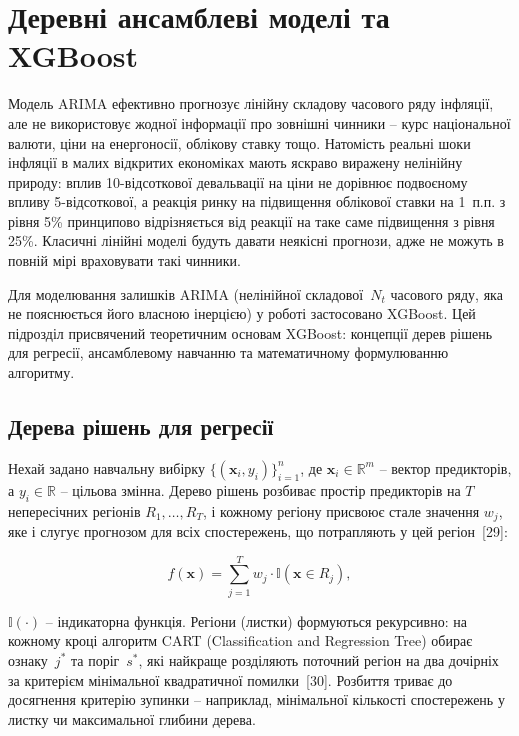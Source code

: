 \documentclass{bachelor_thesis}
\begin{document}
\section{Деревні ансамблеві моделі та XGBoost}

 Модель ARIMA ефективно прогнозує лінійну складову часового ряду інфляції, але не використовує жодної інформації про зовнішні чинники -- курс національної валюти, ціни на енергоносії, облікову ставку тощо. Натомість реальні шоки інфляції в малих відкритих економіках мають яскраво виражену нелінійну природу: вплив 10-відсоткової девальвації на ціни не дорівнює подвоєному впливу 5-відсоткової, а реакція ринку на підвищення облікової ставки на 1~п.п. з рівня 5\% принципово відрізняється від реакції на таке саме підвищення з рівня 25\%. Класичні лінійні моделі будуть давати неякісні прогнози, адже не можуть в повній мірі враховувати такі чинники.

Для моделювання залишків ARIMA (нелінійної складової~$N_t$ часового ряду, яка не пояснюється його власною інерцією) у роботі застосовано XGBoost. Цей підрозділ присвячений теоретичним основам XGBoost: концепції дерев рішень для регресії, ансамблевому навчанню та математичному формулюванню алгоритму.

\subsection{Дерева рішень для регресії}

Нехай задано навчальну вибірку $\{(\mathbf{x}_i, y_i)\}_{i=1}^{n}$, де $\mathbf{x}_i \in \mathbb{R}^m$ -- вектор предикторів, а $y_i \in \mathbb{R}$ -- цільова змінна. Дерево рішень розбиває простір предикторів на $T$ непересічних регіонів $R_1, \ldots, R_T$, і кожному регіону присвоює стале значення $w_j$, яке і слугує прогнозом для всіх спостережень, що потрапляють у цей регіон~[29]:

\begin{equation*}
f(\mathbf{x}) = \sum_{j=1}^{T} w_j \cdot \mathbb{I}(\mathbf{x} \in R_j),
\end{equation*}

 $\mathbb{I}(\cdot)$ -- індикаторна функція. Регіони (листки) формуються рекурсивно: на кожному кроці алгоритм CART (Classification and Regression Tree) обирає ознаку~$j^*$ та поріг~$s^*$, які найкраще розділяють поточний регіон на два дочірніх за критерієм мінімальної квадратичної помилки~[30]. Розбиття триває до досягнення критерію зупинки -- наприклад, мінімальної кількості спостережень у листку чи максимальної глибини дерева.
\end{document}
